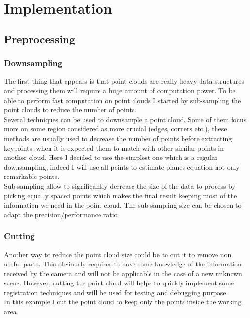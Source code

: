 
\chapter{Implementation}

\section{Preprocessing}

\subsection{Downsampling}

The first thing that appears is that point clouds are really heavy data structures and processing them will require a huge amount of computation power. To be able to perform fast computation on point clouds I started by sub-sampling the point clouds to reduce the number of points. \\
Several techniques can be used to downsample a point cloud. Some of them focus more on some region considered as more crucial (edges, corners etc.), these methods are usually used to decrease the number of points before extracting keypoints, when it is expected them to match with other similar points in another cloud. Here I decided to use the simplest one which is a regular downsampling, indeed I will use all points to estimate planes equation not only remarkable points. \\
\newline
Sub-sampling allow to significantly decrease the size of the data to process by picking equally spaced points which makes the final result keeping most of the information we need in the point cloud. The sub-sampling size can be chosen to adapt the precision/performance ratio.

\subsection{Cutting}

Another way to reduce the point cloud size could be to cut it to remove non useful parts. This obviously requires to have some knowledge of the information received by the camera and will not be applicable in the case of a new unknown scene. However, cutting the point cloud will helps to quickly implement some registration techniques and will be used for testing and debugging purpose. \\
In this example I cut the point cloud to keep only the points inside the working area.

